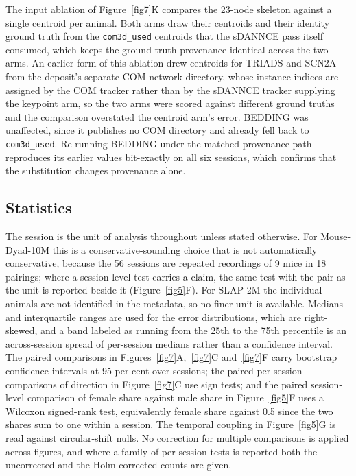 \documentclass[pdflatex, sn-nature]{sn-jnl}
\theoremstyle{thmstyleone}%
\theoremstyle{thmstyletwo}%
\theoremstyle{thmstylethree}%
\begin{document}
The input ablation of Figure~\ref{fig7}K compares the 23-node skeleton against a single centroid per animal. Both arms draw their centroids and their identity ground truth from the \texttt{com3d\_used} centroids that the sDANNCE pass itself consumed, which keeps the ground-truth provenance identical across the two arms. An earlier form of this ablation drew centroids for TRIADS and SCN2A from the deposit's separate COM-network directory, whose instance indices are assigned by the COM tracker rather than by the sDANNCE tracker supplying the keypoint arm, so the two arms were scored against different ground truths and the comparison overstated the centroid arm's error. BEDDING was unaffected, since it publishes no COM directory and already fell back to \texttt{com3d\_used}. Re-running BEDDING under the matched-provenance path reproduces its earlier values bit-exactly on all six sessions, which confirms that the substitution changes provenance alone.

\subsection{Statistics}\label{methods-stats}

The session is the unit of analysis throughout unless stated otherwise. For Mouse-Dyad-10M this is a conservative-sounding choice that is not automatically conservative, because the 56 sessions are repeated recordings of 9 mice in 18 pairings; where a session-level test carries a claim, the same test with the pair as the unit is reported beside it (Figure~\ref{fig5}F). For SLAP-2M the individual animals are not identified in the metadata, so no finer unit is available. Medians and interquartile ranges are used for the error distributions, which are right-skewed, and a band labeled as running from the 25th to the 75th percentile is an across-session spread of per-session medians rather than a confidence interval. The paired comparisons in Figures~\ref{fig7}A,~\ref{fig7}C and~\ref{fig7}F carry bootstrap confidence intervals at 95 per cent over sessions; the paired per-session comparisons of direction in Figure~\ref{fig7}C use sign tests; and the paired session-level comparison of female share against male share in Figure~\ref{fig5}F uses a Wilcoxon signed-rank test, equivalently female share against 0.5 since the two shares sum to one within a session. The temporal coupling in Figure~\ref{fig5}G is read against circular-shift nulls. No correction for multiple comparisons is applied across figures, and where a family of per-session tests is reported both the uncorrected and the Holm-corrected counts are given.
\end{document}
